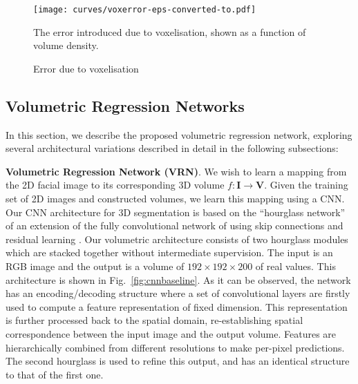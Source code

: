 \begin{figure}
\texttt{[image: curves/voxerror-eps-converted-to.pdf]}
\caption{Error due to voxelisation}{The error introduced due to
  voxelisation, shown as a function of volume density.}
\label{fig:voxerror}
\end{figure}

\subsection{Volumetric Regression Networks}


In this section, we describe the proposed volumetric regression network, exploring several architectural variations described in detail in the following subsections:

\textbf{Volumetric Regression Network (VRN)}. We wish to learn a mapping from the 2D facial image to its
corresponding 3D volume $f: \mathbf{I} \rightarrow \mathbf{V}$. Given
the training set of 2D images and constructed volumes, we learn this mapping using a CNN. Our CNN
architecture for 3D segmentation is based on the ``hourglass
network'' of \cite{newell2016stacked} an extension of the fully
convolutional network of \cite{long2015fully} using skip connections
and residual learning \cite{he2015deep}. Our volumetric architecture consists of two hourglass
modules which are stacked together without intermediate
supervision. The input is an RGB image and the output is a volume of $192\times 192\times 200$ of real values. This architecture is
shown in Fig.~\ref{fig:cnnbaseline}. As it can be observed, the
network has an encoding/decoding structure where a set of convolutional layers are firstly used to compute a feature representation of fixed dimension. This representation is further processed back to the spatial domain, re-establishing spatial correspondence between the input image and the output volume. Features are hierarchically
combined from different resolutions to make per-pixel predictions. The second hourglass is used to refine this output, and has an identical structure to that of the first one.

